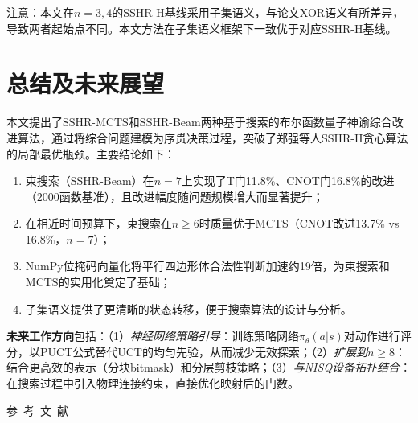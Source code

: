 \documentclass[10.5pt,compsoc,UTF8]{CjC}
\theoremstyle{mystyle}
\begin{document}
注意：本文在$n=3,4$的SSHR-H基线采用子集语义，与论文XOR语义有所差异，导致两者起始点不同。本文方法在子集语义框架下一致优于对应SSHR-H基线。


\section{\heiti 总结及未来展望}

本文提出了SSHR-MCTS和SSHR-Beam两种基于搜索的布尔函数量子神谕综合改进算法，通过将综合问题建模为序贯决策过程，突破了郑强等人\cite{zheng2025cnot}SSHR-H贪心算法的局部最优瓶颈。主要结论如下：

\begin{enumerate}[noitemsep]
    \item 束搜索（SSHR-Beam）在$n=7$上实现了T门11.8\%、CNOT门16.8\%的改进（2000函数基准），且改进幅度随问题规模增大而显著提升；
    \item 在相近时间预算下，束搜索在$n\ge6$时质量优于MCTS（CNOT改进13.7\% vs 16.8\%，$n=7$）；
    \item NumPy位掩码向量化将平行四边形体合法性判断加速约19倍，为束搜索和MCTS的实用化奠定了基础；
    \item 子集语义提供了更清晰的状态转移，便于搜索算法的设计与分析。
\end{enumerate}

\textbf{未来工作方向}包括：（1）\emph{神经网络策略引导}：训练策略网络$\pi_\theta(a|s)$对动作进行评分，以PUCT公式\cite{silver2016mastering}替代UCT的均匀先验，从而减少无效探索；（2）\emph{扩展到$n\ge8$}：结合更高效的表示（分块bitmask）和分层剪枝策略；（3）\emph{与NISQ设备拓扑结合}：在搜索过程中引入物理连接约束，直接优化映射后的门数。


\newpage

\vspace {10mm}
\centerline
{\textsf{参~考~文~献}}
 \addtolength{\itemsep}{-1em}
\vspace {1.5mm}


\end{document}
